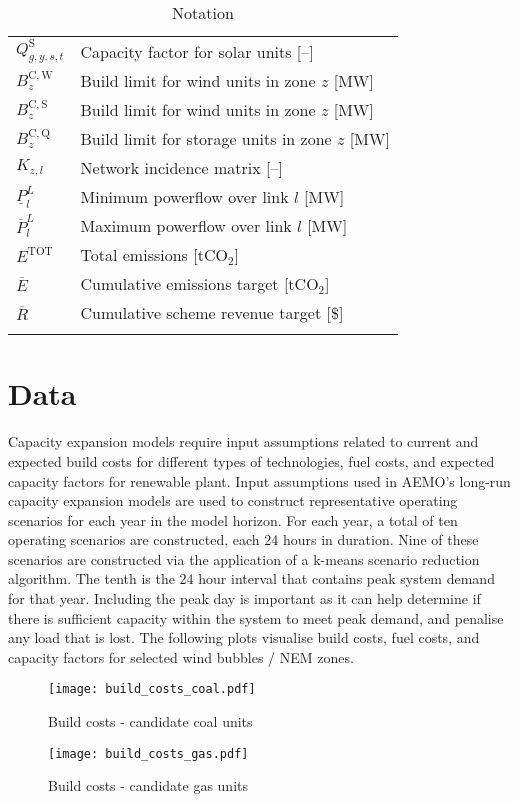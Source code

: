 \documentclass{article}
\newcommand{\iGenerator}{g}
\newcommand{\iYear}{y}
\newcommand{\iScenario}{s}
\newcommand{\iInterval}{t}
\newcommand{\iZone}{z}
\newcommand{\iLink}{l}
\newcommand{\cBuildLimitWind}{B^{\mathrm{C,\mathrm{W}}}_{\iZone}}
\newcommand{\cBuildLimitSolar}{B^{\mathrm{C,\mathrm{S}}}_{\iZone}}
\newcommand{\cBuildLimitStorage}{B^{\mathrm{C,\mathrm{Q}}}_{\iZone}}
\newcommand{\cCapacityFactorSolar}[1][\iGenerator,\iYear,\iScenario,\iInterval]{Q_{#1}^{\mathrm{S}}}
\newcommand{\cIncidenceMatrix}[1][\iZone,\iLink]{K_{#1}}
\newcommand{\cPowerFlowMin}{\underline{P}_{\iLink}^{L}}
\newcommand{\cPowerFlowMax}{\overline{P}_{\iLink}^{L}}
\newcommand{\cEmmissionsCumulativeTarget}{\overline{E}}
\newcommand{\cSchemeRevenueCumulativeTarget}{\overline{R}}
\newcommand{\cEmissionsTotal}{E^{\mathrm{TOT}}}
\begin{document}
\begin{longtable}{ p{}  p{}}
	$\cCapacityFactorSolar$ & Capacity factor for solar units [--]\\
	$\cBuildLimitWind$ & Build limit for wind units in zone $\iZone$ [MW]\\
	$\cBuildLimitSolar$ & Build limit for wind units in zone $\iZone$ [MW]\\
	$\cBuildLimitStorage$ & Build limit for storage units in zone $\iZone$ [MW]\\
	$\cIncidenceMatrix$ & Network incidence matrix [--]\\
	$\cPowerFlowMin$ & Minimum powerflow over link $\iLink$ [MW]\\
	$\cPowerFlowMax$ & Maximum powerflow over link $\iLink$ [MW]\\
	$\cEmissionsTotal$ & Total emissions [tCO$_{2}$]\\
	$\cEmmissionsCumulativeTarget$ & Cumulative emissions target [tCO$_{2}$]\\
	$\cSchemeRevenueCumulativeTarget$ & Cumulative scheme revenue target [\$]\\
	\hline
	\caption{Notation}
\end{longtable}

\section{Data}
Capacity expansion models require input assumptions related to current and expected build costs for different types of technologies, fuel costs, and expected capacity factors for renewable plant. Input assumptions used in AEMO's long-run capacity expansion models are used to construct representative operating scenarios for each year in the model horizon. For each year, a total of ten operating scenarios are constructed, each 24 hours in duration. Nine of these scenarios are constructed via the application of a k-means scenario reduction algorithm. The tenth is the 24 hour interval that contains peak system demand for that year. Including the peak day is important as it can help determine if there is sufficient capacity within the system to meet peak demand, and penalise any load that is lost. The following plots visualise build costs, fuel costs, and capacity factors for selected wind bubbles / NEM zones.


\begin{figure}
	\texttt{[image: build\_costs\_coal.pdf]}
	\caption{Build costs - candidate coal units}
\end{figure}

\begin{figure}
	\texttt{[image: build\_costs\_gas.pdf]}
	\caption{Build costs - candidate gas units}
\end{figure}
\end{document}
